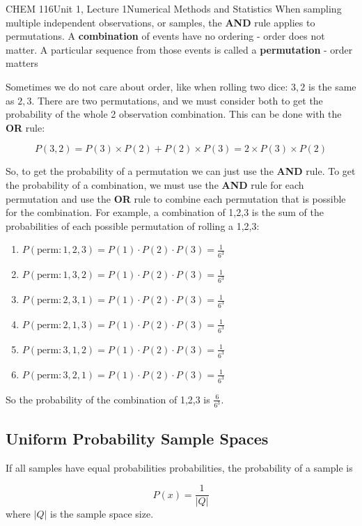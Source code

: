 \documentclass{article}
\begin{document}
\begin{tdoc}{CHEM 116}{Unit 1, Lecture 1}{Numerical Methods and Statistics}
When sampling multiple independent observations, or samples, the {\bf
  AND} rule applies to permutations. A {\bf combination} of events
have no ordering - order does not matter. A particular sequence from
those events is called a {\bf permutation} - order
matters\vspace{0.2cm}

Sometimes we do not care about order, like when rolling two dice:
$3,2$ is the same as $2,3$. There are two permutations, and we must
consider both to get the probability of the whole 2 observation
combination. This can be done with the {\bf OR} rule:

\begin{equation}
P(3,2) = P(3)\times P(2) + P(2) \times P(3) = 2\times P(3)\times P(2)
\end{equation}

So, to get the probability of a permutation we can just use the {\bf
  AND} rule. To get the probability of a combination, we must use the
{\bf AND} rule for each permutation and use the {\bf OR} rule to
combine each permutation that is possible for the combination. For
example, a combination of 1,2,3 is the sum of the probabilities of
each possible permutation of rolling a 1,2,3:
\begin{enumerate}
\item $P(\textrm{perm}: 1,2,3) = P(1)\cdot P(2) \cdot P(3) = \frac{1}{6^3}$
\item $P(\textrm{perm}: 1,3,2) = P(1)\cdot P(2) \cdot P(3) = \frac{1}{6^3}$
\item $P(\textrm{perm}: 2,3,1) = P(1)\cdot P(2) \cdot P(3) = \frac{1}{6^3}$
\item $P(\textrm{perm}: 2,1,3) = P(1)\cdot P(2) \cdot P(3) = \frac{1}{6^3}$
\item $P(\textrm{perm}: 3,1,2) = P(1)\cdot P(2) \cdot P(3) = \frac{1}{6^3}$
\item $P(\textrm{perm}: 3,2,1) = P(1)\cdot P(2) \cdot P(3) = \frac{1}{6^3}$
\end{enumerate}
So the probability of the combination of 1,2,3 is
$\frac{6}{6^3}$.

\subsection{Uniform Probability Sample Spaces}

If all samples have equal probabilities probabilities, the probability of a
sample is

\begin{equation}
P(x) = \frac{1}{|Q|}
\end{equation}
where $|Q|$ is the sample space size.
\vspace{0.2cm}



\end{tdoc}
\end{document}

